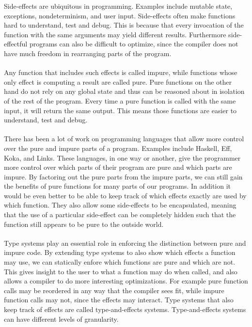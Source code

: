 Side-effects are ubiquitous in programming.
Examples include mutable state, exceptions, nondeterminism, and user input.
Side-effects often make functions hard to understand, test and debug.
This is because that every invocation of the function with the same arguments may yield different results.
Furthermore side-effectful programs can also be difficult to optimize, since the compiler does not have much freedom in rearranging parts of the program.
\\\\
Any function that includes such effects is called impure, while functions whose only effect is computing a result are called pure.
Pure functions on the other hand do not rely on any global state and thus can be reasoned about in isolation of the rest of the program.
Every time a pure function is called with the same input, it will return the same output.
This means those functions are easier to understand, test and debug.
\\\\
There has been a lot of work on programming languages that allow more control over the pure and impure parts of a program.
Examples include Haskell\cite{haskell}, Eff\cite{eff1}, Koka\cite{koka2}, and Links\cite{links}.
These languages, in one way or another, give the programmer more control over which parts of their program are pure and which parts are impure.
By factoring out the pure parts from the impure parts, we can still gain the benefits of pure functions for many parts of our programs.
In addition it would be even better to be able to keep track of which effects exactly are used by which function.
They also allow some side-effects to be encapsulated, meaning that the use of a particular side-effect can be completely hidden such that the function still appears to be pure to the outside world.
\\\\
Type systems play an essential role in enforcing the distinction between pure and impure code.
By extending type systems to also show which effects a function may use, we can statically enfore which functions are pure and which are not.
This gives insight to the user to what a function may do when called, and also allows a compiler to do more interesting optimizations.
For example pure function calls may be reordered in any way that the compiler sees fit, while impure function calls may not, since the effects may interact.
Type systems that also keep track of effects are called type-and-effects systems.
Type-and-effects systems can have different levels of granularity.
